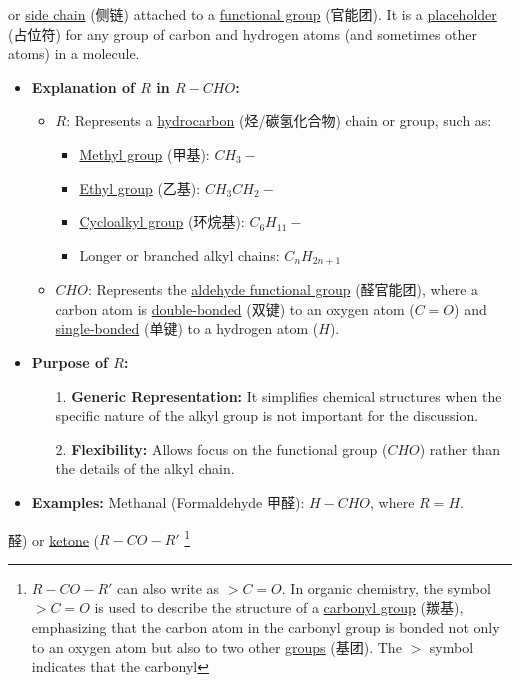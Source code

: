 \begin{itemize}
{    or \underline{side chain} (侧链) attached to a \underline{functional group} \footnotemark[9] (官能团). It is a
    \underline{placeholder} (占位符) for any group of carbon and hydrogen atoms (and sometimes other atoms) in a molecule.
    \begin{itemize}
        \item \textbf{Explanation of $R$ in $R-CHO$:}
        \begin{itemize}
            \item $R$: Represents a \underline{hydrocarbon} (烃/碳氢化合物) chain or group, such as:
            \begin{itemize}
                \item \underline{Methyl group} (甲基): $CH_3-$
                \item \underline{Ethyl group} (乙基): $CH_3CH_2-$
                \item \underline{Cycloalkyl group} (环烷基): $C_6H_{11}-$
                \item Longer or branched alkyl chains: $C_nH_{2n+1}$
            \end{itemize}
            \item $CHO$: Represents the \underline{aldehyde functional group} (醛官能团), where a carbon atom is
            \underline{double-bonded} (双键) to an oxygen atom ($C=O$) and \underline{single-bonded} (单键) to a hydrogen atom
            ($H$).
        \end{itemize}
        \item \textbf{Purpose of $R$:}
        \begin{itemize}
            \item[1.] \textbf{Generic Representation:} It simplifies chemical structures when the specific nature of the alkyl
            group is not important for the discussion.
            \item[2.] \textbf{Flexibility:} Allows focus on the functional group ($CHO$) rather than the details of the alkyl
            chain.
        \end{itemize}
        \item \textbf{Examples:} Methanal (Formaldehyde 甲醛): $H-CHO$, where $R=H$.
    \end{itemize}} 醛) or
    \underline{ketone} ($R-CO-R'$ \footnote{$R-CO-R'$ can also write as $>C=O$. In organic chemistry, the symbol $>C=O$ is used
    to describe the structure of a \underline{carbonyl group} (羰基), emphasizing that the carbon atom in the carbonyl group is
    bonded not only to an oxygen atom but also to two other \underline{groups} (基团). The $>$ symbol indicates that the carbonyl
}
\end{itemize}
